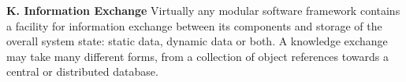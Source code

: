 \textbf{K. Information Exchange}
Virtually any modular software framework contains a facility for information exchange between its components and storage of the overall system state: static data, dynamic data or both. A knowledge exchange may take many different forms, from a collection of object references towards a central or distributed database. 